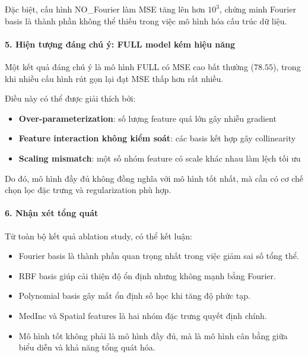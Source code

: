Đặc biệt, cấu hình NO\_Fourier làm MSE tăng lên hơn $10^3$,
chứng minh Fourier basis là thành phần không thể thiếu trong việc
mô hình hóa cấu trúc dữ liệu.

\paragraph{5. Hiện tượng đáng chú ý: FULL model kém hiệu năng}

Một kết quả đáng chú ý là mô hình FULL có MSE cao bất thường ($78.55$),
trong khi nhiều cấu hình rút gọn lại đạt MSE thấp hơn rất nhiều.

Điều này có thể được giải thích bởi:

\begin{itemize}
    \item \textbf{Over-parameterization}: số lượng feature quá lớn gây nhiễu gradient
    \item \textbf{Feature interaction không kiểm soát}: các basis kết hợp gây collinearity
    \item \textbf{Scaling mismatch}: một số nhóm feature có scale khác nhau làm lệch tối ưu
\end{itemize}

Do đó, mô hình đầy đủ không đồng nghĩa với mô hình tốt nhất,
mà cần có cơ chế chọn lọc đặc trưng và regularization phù hợp.

\paragraph{6. Nhận xét tổng quát}

Từ toàn bộ kết quả ablation study, có thể kết luận:

\begin{itemize}
    \item Fourier basis là thành phần quan trọng nhất trong việc giảm sai số tổng thể.
    \item RBF basis giúp cải thiện độ ổn định nhưng không mạnh bằng Fourier.
    \item Polynomial basis gây mất ổn định số học khi tăng độ phức tạp.
    \item MedInc và Spatial features là hai nhóm đặc trưng quyết định chính.
    \item Mô hình tốt không phải là mô hình đầy đủ, mà là mô hình cân bằng giữa
    biểu diễn và khả năng tổng quát hóa.
\end{itemize}

